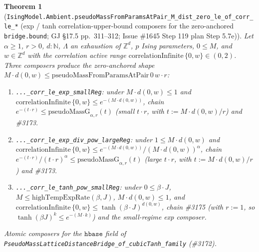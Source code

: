\documentclass[a4paper,11pt]{article}
\newtheorem{theorem}{Theorem}
\begin{document}
\begin{theorem}[\texttt{IsingModel.Ambient.pseudoMassFromParamsAtPair\_M\_dist\_zero\_le\_of\_corr\_le\_*}
(exp / tanh correlation-upper-bound composers for the zero-anchored
\texttt{bridge.bound};
GJ \S17.5 pp.~311--312; Issue \#1645 Step 119 plan Step 5.7e)]
Let $\alpha \ge 1$, $r > 0$, $d : \mathbb{N}$, $\Lambda$ an exhaustion of
$\mathbb{Z}^d$, $p$ Ising parameters, $0 \le M$, and $w \in \mathbb{Z}^d$
with the correlation active range
$\mathrm{correlationInfinite}\,\{0,w\} \in (0, 2)$. Three composers produce
the zero-anchored shape $M \cdot d(0, w) \le
\mathrm{pseudoMassFromParamsAtPair}\,0\,w \cdot r$:
\begin{enumerate}
  \item \texttt{...\_corr\_le\_exp\_smallReg}: under $M \cdot d(0,w) \le 1$
    and $\mathrm{correlationInfinite}\,\{0,w\} \le e^{-(M \cdot d(0,w))}$,
    chain $e^{-(t \cdot r)} \le \mathrm{pseudoMassG}_{\alpha, r}(t)$ (small
    $t \cdot r$, with $t := M \cdot d(0, w)/r$) and \#3173.
  \item \texttt{...\_corr\_le\_exp\_div\_pow\_largeReg}: under
    $1 \le M \cdot d(0,w)$ and
    $\mathrm{correlationInfinite}\,\{0,w\} \le e^{-(M \cdot d(0,w))} /
    (M \cdot d(0,w))^\alpha$,
    chain $e^{-(t \cdot r)} / (t \cdot r)^\alpha \le
    \mathrm{pseudoMassG}_{\alpha, r}(t)$ (large $t \cdot r$, with
    $t := M \cdot d(0, w)/r$) and \#3173.
  \item \texttt{...\_corr\_le\_tanh\_pow\_smallReg}: under
    $0 \le \beta \cdot J$, $M \le \mathrm{highTempExpRate}(\beta, J)$,
    $M \cdot d(0, w) \le 1$, and
    $\mathrm{correlationInfinite}\,\{0,w\} \le \tanh(\beta \cdot J)^{d(0,w)}$,
    chain \#3175 (with $r := 1$, so $\tanh(\beta J)^k \le e^{-(M\cdot k)}$)
    and the small-regime exp composer.
\end{enumerate}
Atomic composers for the $\mathtt{hbase}$ field of
\texttt{PseudoMassLatticeDistanceBridge\_of\_cubicTanh\_family} (\#3172).
\end{theorem}
\end{document}
